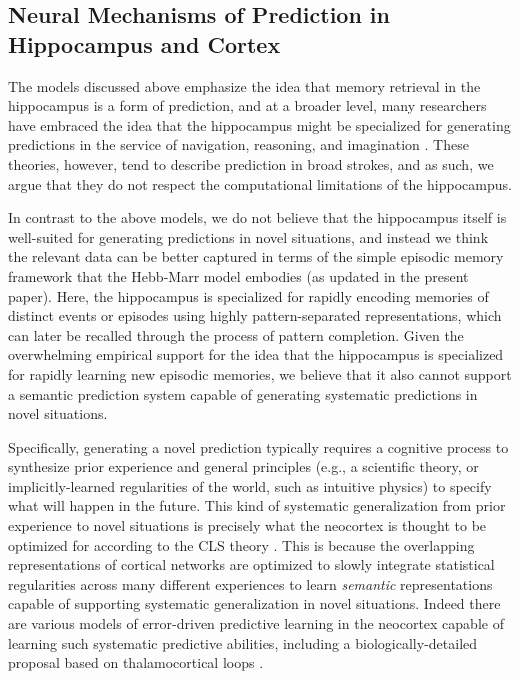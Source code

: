 \documentclass[11pt,twoside]{article}
\newif\myifpdf
\begin{document}
\subsection{Neural Mechanisms of Prediction in Hippocampus and Cortex}

The models discussed above emphasize the idea that memory retrieval in the hippocampus is a form of prediction, and at a broader level, many researchers have embraced the idea that the hippocampus might be specialized for generating predictions in the service of navigation, reasoning, and imagination \citep{Buckner10,DavachiDuBrow15,KokTurk-Browne18,Mizumori13,LismanRedish09,ZeithamovaSchlichtingPreston12,MackLovePreston18,ZeithamovaSchlichtingPreston12,JungLeeJeongEtAl18}. These theories, however, tend to describe prediction in broad strokes, and as such, we argue that they do not respect the computational limitations of the hippocampus.

In contrast to the above models, we do not believe that the hippocampus itself is well-suited for generating predictions in novel situations, and instead we think the relevant data can be better captured in terms of the simple episodic memory framework that the Hebb-Marr model embodies  (as updated in the present paper).  Here, the hippocampus is specialized for rapidly encoding memories of distinct events or episodes using highly pattern-separated representations, which can later be recalled through the process of pattern completion.  Given the overwhelming empirical support for the idea that the hippocampus is specialized for rapidly learning new episodic memories, we believe that it also cannot support a semantic prediction system capable of generating systematic predictions in novel situations.

Specifically, generating a novel prediction typically requires a cognitive process to synthesize prior experience and general principles (e.g., a scientific theory, or implicitly-learned regularities of the world, such as intuitive physics) to specify what will happen in the future.  This kind of systematic generalization from prior experience to novel situations is precisely what the neocortex is thought to be optimized for according to the CLS theory \citep{McClellandMcNaughtonOReilly95,OReillyBhattacharyyaHowardEtAl14,OReillyRanganathRussin21}.  This is because the overlapping representations of cortical networks are optimized to slowly integrate statistical regularities across many different experiences to learn \emph{semantic} representations capable of supporting systematic generalization in novel situations. Indeed there are various models of error-driven predictive learning in the neocortex capable of learning such systematic predictive abilities, including a biologically-detailed proposal based on thalamocortical loops \citep{OReillyRussinZolfagharEtAl21}. 
\end{document}
